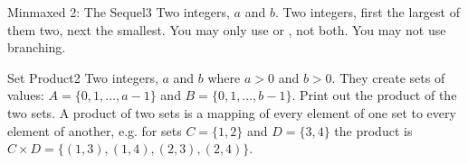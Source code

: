 \begin{task}{Minmaxed 2: The Sequel}{3}
\In
Two integers, $a$ and $b$.
\Out
Two integers, first the largest of them two, next the smallest.
\Note
You may  only use  or , not both. You may not use branching.
\end{task}

\begin{task}{Set Product}{2}
\In
Two integers, $a$ and $b$ where $a > 0$ and $b > 0$. They create sets of values:
$A = \{0, 1, \dots, a - 1\}$ and $B = \{0, 1, \dots, b - 1\}$.
\Out
Print out the product of the two sets.
\Note
A product of two sets is a mapping of every element of one set to every element
of another, e.g. for sets $C = \{1, 2\}$ and $D = \{3, 4\}$ the product is
$C \times D = \{(1, 3), (1, 4), (2, 3), (2, 4)\}$.
\end{task}
